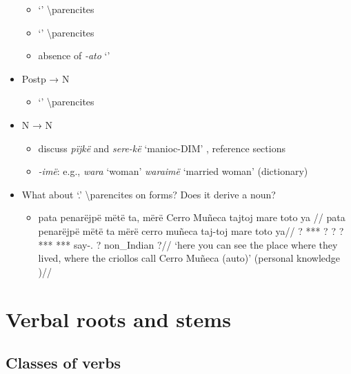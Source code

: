 \documentclass{memoir}
\begin{document}
\begin{itemize}
  \begin{itemize}
  \tightlist
  \item
     `' \textbackslash parencites
  \item
     `' \textbackslash parencites
  \item
    absence of \emph{-ato} `'
  \end{itemize}
\item
  Postp → N

  \begin{itemize}
  \tightlist
  \item
     `' \textbackslash parencites
  \end{itemize}
\item
  N → N

  \begin{itemize}
  \tightlist
  \item
    discuss \emph{pïjkë} and \emph{sere-kë} `manioc-DIM' , reference
    sections
  \item
    \emph{-imë}: e.g., \emph{wara} `woman' \emph{waraimë} `married
    woman' (dictionary)
  \end{itemize}
\item
  What about  `.'
  \textbackslash parencites on  forms? Does it derive a noun?

  \begin{itemize}
  \item
    \ex \label{histyarirdi-592}
    \begingl \glpreamble pata penarëjpë mëtë ta, mërë Cerro Muñeca tajtoj mare toto ya //
    \gla pata penarëjpë mëtë ta mërë cerro muñeca taj-toj mare toto ya//
    \glb ? *** ? ? ? *** *** say-. ? non\_Indian ?//
    \glft ‘here you can see the place where they lived, where the criollos call Cerro Muñeca (auto)’ (personal knowledge
    )//
    \endgl
    \xe
  \end{itemize}
\end{itemize}

\chapter{\texorpdfstring{Verbal roots and stems
\label{verbderiv}}{Verbal roots and stems }}

\section{Classes of verbs}
\end{document}
